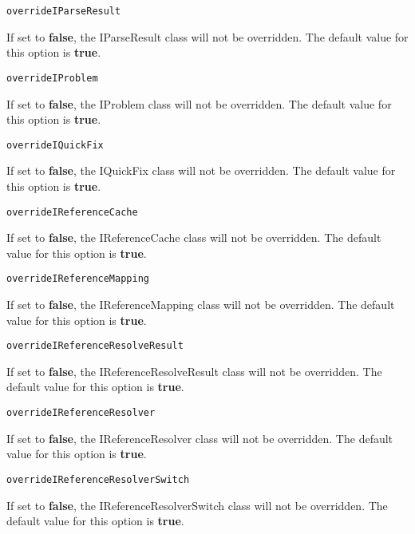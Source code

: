 \noindent\texttt{overrideIParseResult}
\begin{myindentpar}{1cm}
If set to \textbf{false}, the IParseResult class will not be overridden. The default value for this option is \textbf{true}.
\end{myindentpar}

\noindent\texttt{overrideIProblem}
\begin{myindentpar}{1cm}
If set to \textbf{false}, the IProblem class will not be overridden. The default value for this option is \textbf{true}.
\end{myindentpar}

\noindent\texttt{overrideIQuickFix}
\begin{myindentpar}{1cm}
If set to \textbf{false}, the IQuickFix class will not be overridden. The default value for this option is \textbf{true}.
\end{myindentpar}

\noindent\texttt{overrideIReferenceCache}
\begin{myindentpar}{1cm}
If set to \textbf{false}, the IReferenceCache class will not be overridden. The default value for this option is \textbf{true}.
\end{myindentpar}

\noindent\texttt{overrideIReferenceMapping}
\begin{myindentpar}{1cm}
If set to \textbf{false}, the IReferenceMapping class will not be overridden. The default value for this option is \textbf{true}.
\end{myindentpar}

\noindent\texttt{overrideIReferenceResolveResult}
\begin{myindentpar}{1cm}
If set to \textbf{false}, the IReferenceResolveResult class will not be overridden. The default value for this option is \textbf{true}.
\end{myindentpar}

\noindent\texttt{overrideIReferenceResolver}
\begin{myindentpar}{1cm}
If set to \textbf{false}, the IReferenceResolver class will not be overridden. The default value for this option is \textbf{true}.
\end{myindentpar}

\noindent\texttt{overrideIReferenceResolverSwitch}
\begin{myindentpar}{1cm}
If set to \textbf{false}, the IReferenceResolverSwitch class will not be overridden. The default value for this option is \textbf{true}.
\end{myindentpar}

